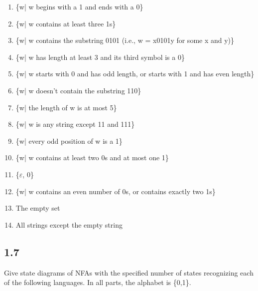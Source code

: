 \begin{enumerate}[label=(\alph*), leftmargin=2.5em]

\item \{w| w begins with a 1 and ends with a 0\}

\item \{w| w contains at least three 1s\}

\item \{w| w contains the substring 0101 (i.e., w = x0101y for some x and y)\}

\item \{w| w has length at least 3 and its third symbol is a 0\}

\item \{w| w starts with 0 and has odd length, or starts with 1 and has even length\}

\item \{w| w doesn't contain the substring 110\}

\item \{w| the length of w is at most 5\}

\item \{w| w is any string except 11 and 111\}

\item \{w| every odd position of w is a 1\}

\item \{w| w contains at least two 0s and at most one 1\}

\item \{$\varepsilon$, 0\}

\item \{w| w contains an even number of 0s, or contains exactly two 1s\}

\item The empty set

\item All strings except the empty string

\end{enumerate}


\subsection*{1.7}

Give state diagrams of NFAs with the specified number of states recognizing each of the following languages. In all parts, the alphabet is \{0,1\}.

